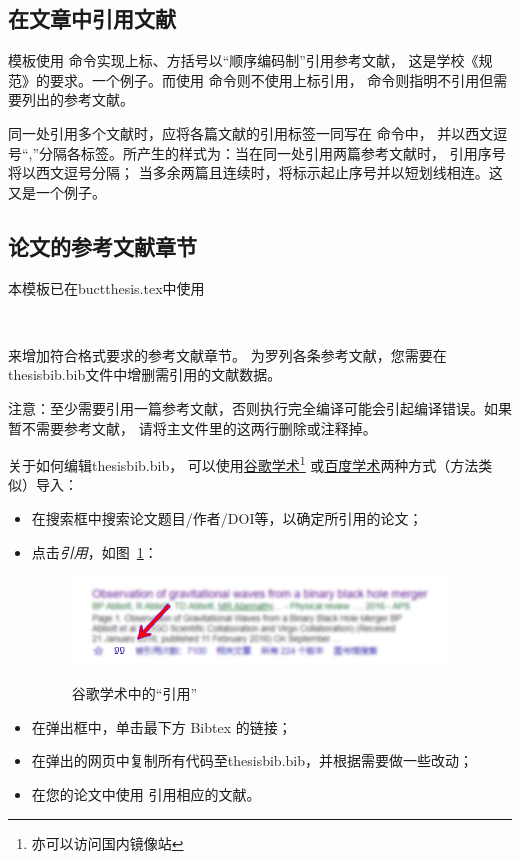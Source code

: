 \subsection{在文章中引用文献}
模板使用 命令实现上标、方括号以“顺序编码制”引用参考文献，
这是学校《规范》的要求。一个例子。\cite{abbott2016observation}而使用
命令则不使用上标引用，
命令则指明不引用但需要列出的参考文献。

同一处引用多个文献时，应将各篇文献的引用标签一同写在  命令中，
并以西文逗号“,”分隔各标签。所产生的样式为：当在同一处引用两篇参考文献时，
引用序号将以西文逗号分隔；
当多余两篇且连续时，将标示起止序号并以短划线相连。这\cite{texbook,latexrumen}
又是\cite{texbook,latexrumen,gbt7714-2005}一个例子。\cite{abbott2016observation,texbook,latexrumen,buctthesis}


\subsection{论文的参考文献章节}
本模板已在\textsf{buctthesis.tex}中使用
\begin{lstlisting}[firstnumber=52]


	\end{lstlisting}
来增加符合格式要求的参考文献章节。
为罗列各条参考文献，您需要在\textsf{thesisbib.bib}文件中增删需引用的文献数据。

注意：至少需要引用一篇参考文献，否则执行完全编译可能会引起编译错误。如果暂不需要参考文献，
请将主文件里的这两行删除或注释掉。

关于如何编辑\textsf{thesisbib.bib}，
可以使用\href{http://scholar.google.com.cn/}{谷歌学术}\footnote{亦可以访问国内镜像站}
或\href{http://xueshu.baidu.com}{百度学术}两种方式（方法类似）导入\BibTeX{}：
\begin{itemize}
	\item 在搜索框中搜索论文题目/作者/DOI等，以确定所引用的论文；
	\item 点击\emph{引用}，如图~\ref{fig:addbib}：
			\begin{figure}[htbp]
				\centering
				\caption{谷歌学术中的``引用''}
				\includegraphics[width=10cm]{figure/AddBib.png}
				\label{fig:addbib}
			\end{figure}
	\item 在弹出框中，单击最下方 Bibtex 的链接；
	\item 在弹出的网页中复制所有代码至\textsf{thesisbib.bib}，并根据需要做一些改动；
	\item 在您的论文中使用 引用相应的文献。
\end{itemize}

